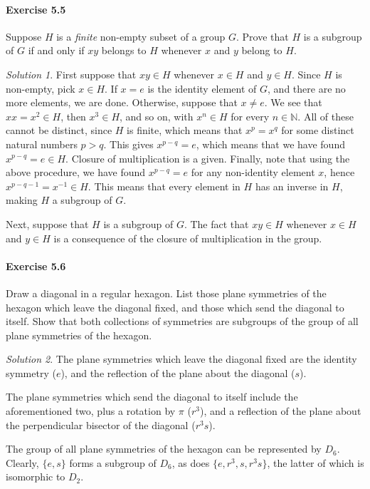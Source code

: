 \documentclass[11pt]{report}
\def\N{\mathbb{N}}
\theoremstyle{remark}
\newtheorem*{solution}{Solution}
\begin{document}
    \paragraph{Exercise 5.5} Suppose $H$ is a \textit{finite} non-empty subset of
    a group $G$. Prove that $H$ is a subgroup of $G$ if and only if $xy$ belongs to
    $H$ whenever $x$ and $y$ belong to $H$.
    \begin{solution}
        First suppose that $xy \in H$ whenever $x \in H$ and $y \in H$. Since $H$ is
        non-empty, pick $x \in H$. If $x = e$ is the identity element of $G$, and
        there are no more elements, we are done. Otherwise, suppose that $x \neq e$.
        We see that $x x = x^2 \in H$, then $x^3 \in H$, and so on, with $x^n \in H$
        for every $n \in \N$. All of these cannot be distinct, since $H$ is finite,
        which means that $x^p = x^q$ for some distinct natural numbers $p > q$. This
        gives $x^{p - q} = e$, which means that we have found $x^{p - q} = e \in H$.
        Closure of multiplication is a given. Finally, note that using the above
        procedure, we have found $x^{p - q} = e$ for any non-identity element $x$,
        hence $x^{p - q - 1} = x^{-1} \in H$. This means that every element in $H$
        has an inverse in $H$, making $H$ a subgroup of $G$.

        Next, suppose that $H$ is a subgroup of $G$. The fact that $xy \in H$
        whenever $x \in H$ and $y \in H$ is a consequence of the closure of
        multiplication in the group.
    \end{solution}
    
    \paragraph{Exercise 5.6} Draw a diagonal in a regular hexagon. List those plane
    symmetries of the hexagon which leave the diagonal fixed, and those which send
    the diagonal to itself. Show that both collections of symmetries are subgroups
    of the group of all plane symmetries of the hexagon.
    \begin{solution}
        The plane symmetries which leave the diagonal fixed are the identity
        symmetry ($e$), and the reflection of the plane about the diagonal ($s$).

        The plane symmetries which send the diagonal to itself include the
        aforementioned two, plus a rotation by $\pi$ ($r^3$), and a reflection of
        the plane about the perpendicular bisector of the diagonal ($r^3s$).

        The group of all plane symmetries of the hexagon can be represented by
        $D_6$. Clearly, $\{e, s\}$ forms a subgroup of $D_6$, as does $\{e, r^3, s,
        r^3s\}$, the latter of which is isomorphic to $D_2$.
    \end{solution}
\end{document}
